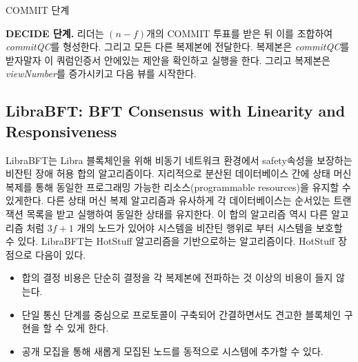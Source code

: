 \documentclass[table,smallextended]{svjour3}       %
\begin{document}
\begin{algorithm}
  \caption{COMMIT 단계}
\end{algorithm}


\textbf{DECIDE 단계.} 리더는 \((n-f)\)개의 COMMIT 투표를 받은 뒤 이를 조합하여 \textit{commitQC}를
형성한다. 그리고 모든 다른 복제본에 전달한다. 복제본은 \textit{commitQC}를 받자말자 이 쿼럼인증서 안에있는
제안을 확인하고 실행을 한다. 그리고 복제본은 \textit{viewNumber}를 증가시키고 다음 뷰를 시작한다.



\subsection{LibraBFT: BFT Consensus with Linearity and Responsiveness}
LibraBFT는 Libra 블록체인을 위해 비동기 네트워크 환경에서 safety속성을 보장하는 비잔틴 장애 허용 합의 알고리즘이다.
지리적으로 분산된 데이터베이스 간에 상태 머신 복제를 통해 동일한 프로그래밍 가능한 리소스(programmable resources)을
유지할 수 있게한다. 다른 상태 머신 복제 알고리즘과 유사하게 
각 데이터베이스는 순서있는 트랜잭션 목록을 받고 실행하여 동일한 상태를 유지한다.
 이 합의 알고리즘 역시 다른 알고리즘 처럼 \(3f+1\) 개의 노드가 있어야 시스템을 비잔틴 행위로 부터
시스템을 보호할 수 있다. LibraBFT는 HotStuff 알고리즘을 기반으로하는 알고리즘이다. HotStuff 장점으로 다음이 있다.
\begin{itemize}
  \item 합의 결정 비용은 단순히 결정을 각 복제본에 전파하는 것 이상의 비용이 들지 않는다.
  \item 단일 통신 단계를 중심으로 프로토콜이 구축되어 간결하면서도 견고한 블록체인 구현을 할 수 있게 한다.
  \item 공개 모집을 통해 새롭게 모집된 노드를 동적으로 시스템에 추가할 수 있다. 
\end{itemize}
\end{document}
